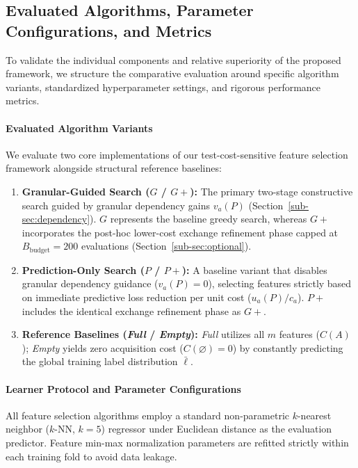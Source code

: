 \subsection{Evaluated Algorithms, Parameter Configurations, and Metrics}
\label{subsec:exp-metrics}

To validate the individual components and relative superiority of the proposed framework, we structure the comparative evaluation around specific algorithm variants, standardized hyperparameter settings, and rigorous performance metrics.

\paragraph{Evaluated Algorithm Variants}
We evaluate two core implementations of our test-cost-sensitive feature selection framework alongside structural reference baselines:
\begin{enumerate}[label=(\arabic*), leftmargin=*]
	\item \textbf{Granular-Guided Search ($G$ / $G+$):} The primary two-stage constructive search guided by granular dependency gains $v_a(P)$ (Section~\ref{sub-sec:dependency}). $G$ represents the baseline greedy search, whereas $G+$ incorporates the post-hoc lower-cost exchange refinement phase capped at $B_{\mathrm{budget}} = 200$ evaluations (Section~\ref{sub-sec:optional}).
	\item \textbf{Prediction-Only Search ($P$ / $P+$):} A baseline variant that disables granular dependency guidance ($v_a(P) = 0$), selecting features strictly based on immediate predictive loss reduction per unit cost ($u_a(P) / c_a$). $P+$ includes the identical exchange refinement phase as $G+$.
	\item \textbf{Reference Baselines (\textit{Full} / \textit{Empty}):} \textit{Full} utilizes all $m$ features ($C(A)$); \textit{Empty} yields zero acquisition cost ($C(\varnothing) = 0$) by constantly predicting the global training label distribution $\bar{\boldsymbol{\ell}}$.
\end{enumerate}

\paragraph{Learner Protocol and Parameter Configurations}
All feature selection algorithms employ a standard non-parametric $k$-nearest neighbor ($k$-NN, $k=5$) regressor under Euclidean distance as the evaluation predictor. Feature min-max normalization parameters are refitted strictly within each training fold to avoid data leakage. 

